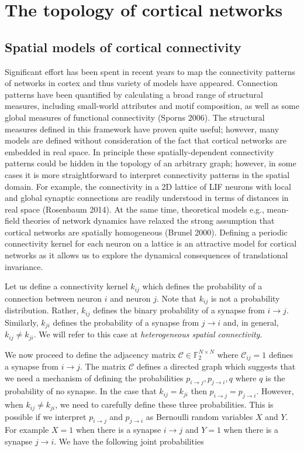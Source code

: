 \documentclass{ucetd}
\begin{document}
\chapter{The topology of cortical networks}

\section{Spatial models of cortical connectivity}

Significant effort has been spent in recent years to map the connectivity patterns of networks in cortex and thus variety of models have appeared. Connection patterns have been quantified by calculating a broad range of structural measures, including small-world attributes and motif composition, as well as some global measures of functional connectivity (Sporns 2006). The structural measures defined in this framework have proven quite useful; however, many models are defined without consideration of the fact that cortical networks are embedded in real space. In principle these spatially-dependent connectivity patterns could be hidden in the topology of an arbitrary graph; however, in some cases it is more straightforward to interpret connectivity patterns in the spatial domain. For example, the connectivity in a 2D lattice of LIF neurons with local and global synaptic connections are readily understood in terms of distances in real space (Rosenbaum 2014). At the same time, theoretical models e.g., mean-field theories of network dynamics have relaxed the strong assumption that cortical networks are spatially homogeneous (Brunel 2000). Defining a periodic connectivity kernel for each neuron on a lattice is an attractive model for cortical networks as it allows us to explore the dynamical consequences of translational invariance.


Let us define a connectivity kernel $k_{ij}$ which defines the probability of a connection between neuron $i$ and neuron $j$. Note that $k_{ij}$ is not a probability distribution. Rather, $k_{ij}$ defines the binary probability of a synapse from $i\rightarrow j$. Similarly, $k_{ji}$ defines the probability of a synapse from $j\rightarrow i$ and, in general, $k_{ij} \neq k_{ji}$. We will refer to this case at \emph{heterogeneous spatial connectivity}. 

We now proceed to define the adjacency matrix $\mathcal{C} \in \mathbb{F}_{2}^{N\times N}$ where $\mathcal{C}_{ij} = 1$ defines a synapse from $i\rightarrow j$. The matrix $\mathcal{C}$ defines a directed graph which suggests that we need a mechanism of defining the probabilities $p_{i\rightarrow j}, p_{j\rightarrow i}, q$ where $q$ is the probability of no synapse. In the case that $k_{ij} = k_{ji}$ then $p_{i\rightarrow j} =  p_{j\rightarrow i}$. However, when $k_{ij} \neq k_{ji}$, we need to carefully define these three probabilities. This is possible if we interpret $p_{i\rightarrow j}$ and $p_{j\rightarrow i}$ as Bernoulli random variables $X$ and $Y$. For example $X = 1$ when there is a synapse $i\rightarrow j$ and $Y = 1$ when there is a synapse $j\rightarrow i$. We have the following joint probabilities
\end{document}
